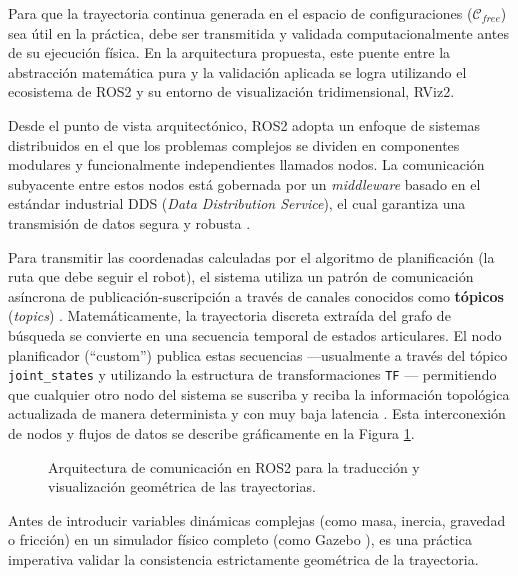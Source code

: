Para que la trayectoria continua generada en el espacio de configuraciones 
($\mathcal{C}_{free}$) sea útil en la práctica, debe ser transmitida y validada 
computacionalmente antes de su ejecución física. En la arquitectura propuesta, este 
puente entre la abstracción matemática pura y la validación aplicada se logra utilizando 
el ecosistema de ROS2 y su entorno de visualización tridimensional, RViz2.

Desde el punto de vista arquitectónico, ROS2 adopta un enfoque de sistemas distribuidos en el 
que los problemas complejos se dividen en componentes modulares y funcionalmente independientes 
llamados nodos. La comunicación subyacente entre estos nodos está gobernada por un 
\textit{middleware} basado en el estándar industrial DDS (\textit{Data Distribution Service}), el cual 
garantiza una transmisión de datos segura y robusta \parencite{macenski2022robot}.

Para transmitir las coordenadas calculadas por el algoritmo de planificación (la ruta que debe 
seguir el robot), el sistema utiliza un patrón de comunicación asíncrona de 
publicación-suscripción a través de canales conocidos como \textbf{tópicos} (\textit{topics}) \parencite{macenski2022robot}. 
Matemáticamente, la trayectoria discreta extraída del grafo de búsqueda se convierte en 
una secuencia temporal de estados articulares. El nodo planificador (\enquote{custom}) publica estas 
secuencias —usualmente a través del tópico \texttt{joint\_states} y utilizando la estructura 
de transformaciones \texttt{TF} \parencite{chitta2012moveit}— permitiendo que cualquier otro nodo del sistema se suscriba y reciba 
la información topológica actualizada de manera determinista y con muy baja latencia \parencite{macenski2022robot}. 
Esta interconexión de nodos y flujos de datos se describe gráficamente en la Figura \ref{fig:arquitectura_ros2}.

\begin{figure}[htbp]
    \centering
    

    \caption{Arquitectura de comunicación en ROS2 para la traducción y visualización geométrica de las trayectorias.}
    \label{fig:arquitectura_ros2}
\end{figure}

Antes de introducir variables dinámicas complejas (como masa, inercia, gravedad o fricción) 
en un simulador físico completo (como Gazebo \parencite{macenski2022robot}), es una práctica imperativa validar 
la consistencia estrictamente geométrica de la trayectoria. 

